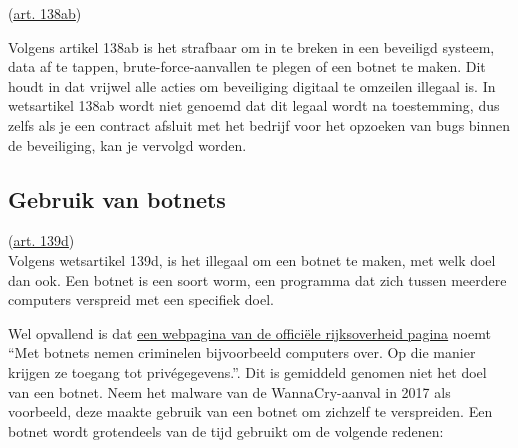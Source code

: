 \documentclass[
]{article}
\begin{document}
(\href{https://wetten.overheid.nl/jci1.3:c:BWBR0001854\&boek=Tweede\&titeldeel=V\&artikel=138ab\&z=2021-07-01\&g=2021-07-01}{\underline{art.
138ab}})

Volgens artikel 138ab is het strafbaar om in te breken in een beveiligd
systeem, data af te tappen, brute-force-aanvallen te plegen of een
botnet te maken. Dit houdt in dat vrijwel alle acties om beveiliging
digitaal te omzeilen illegaal is. In wetsartikel 138ab wordt niet
genoemd dat dit legaal wordt na toestemming, dus zelfs als je een
contract afsluit met het bedrijf voor het opzoeken van bugs binnen de
beveiliging, kan je vervolgd worden.

\hypertarget{gebruik-van-botnets}{%
\subsection{Gebruik van botnets}\label{gebruik-van-botnets}}

(\href{https://wetten.overheid.nl/jci1.3:c:BWBR0001854\&boek=Tweede\&titeldeel=V\&artikel=139d\&z=2021-07-01\&g=2021-07-01}{\underline{art.
139d}})\\
Volgens wetsartikel 139d, is het illegaal om een botnet te maken, met
welk doel dan ook. Een botnet is een soort worm, een programma dat zich
tussen meerdere computers verspreid met een specifiek doel.

Wel opvallend is dat
\href{https://www.rijksoverheid.nl/onderwerpen/cybercrime-en-cybersecurity/cybercriminaliteit-bestrijden}{\underline{een
webpagina van de officiële rijksoverheid pagina}} noemt ``Met botnets
nemen criminelen bijvoorbeeld computers over. Op die manier krijgen ze
toegang tot privégegevens.''. Dit is gemiddeld genomen niet het doel van
een botnet. Neem het malware van de WannaCry-aanval in 2017 als
voorbeeld, deze maakte gebruik van een botnet om zichzelf te
verspreiden. Een botnet wordt grotendeels van de tijd gebruikt om de
volgende redenen:
\end{document}

